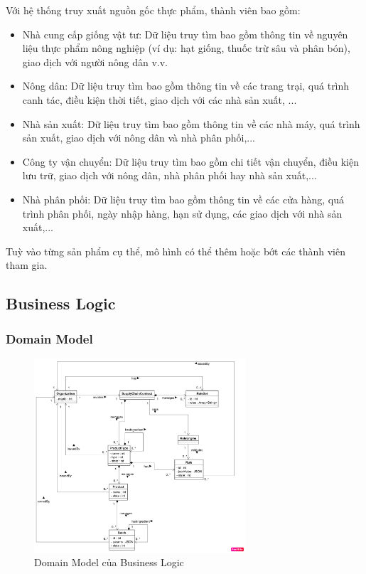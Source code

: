 Với hệ thống truy xuất nguồn gốc thực phẩm, thành viên bao gồm: 
\begin{itemize}
    \item Nhà cung cấp giống vật tư: Dữ liệu truy tìm bao gồm thông tin về nguyên liệu 
    thực phẩm nông nghiệp (ví dụ: hạt giống, thuốc trừ sâu và phân bón), giao dịch với người nông dân v.v.
    \item Nông dân: Dữ liệu truy tìm bao gồm thông tin về các trang trại, quá trình canh tác,
    điều kiện thời tiết, giao dịch với các nhà sản xuất, ...
    \item Nhà sản xuất: Dữ liệu truy tìm bao gồm thông tin về các nhà máy, quá trình sản xuất,
    giao dịch với nông dân và nhà phân phối,...
    \item Công ty vận chuyển: Dữ liệu truy tìm bao gồm chi tiết vận chuyển, điều kiện lưu trữ, giao
    dịch với nông dân, nhà phân phối hay nhà sản xuất,...
    \item Nhà phân phối: Dữ liệu truy tìm bao gồm thông tin về các cửa hàng, quá trình phân phối,
    ngày nhập hàng, hạn sử dụng, các giao dịch với nhà sản xuất,...
\end{itemize}

Tuỳ vào từng sản phẩm cụ thể, mô hình có thể thêm hoặc bớt các thành viên tham gia. 
\subsection{Business Logic}
\subsubsection{Domain Model}

\begin{figure}[h]
    \centering
    \includegraphics[width=0.7\textwidth]{images/domain_model.png}
    \caption{Domain Model của Business Logic} 
\end{figure}

